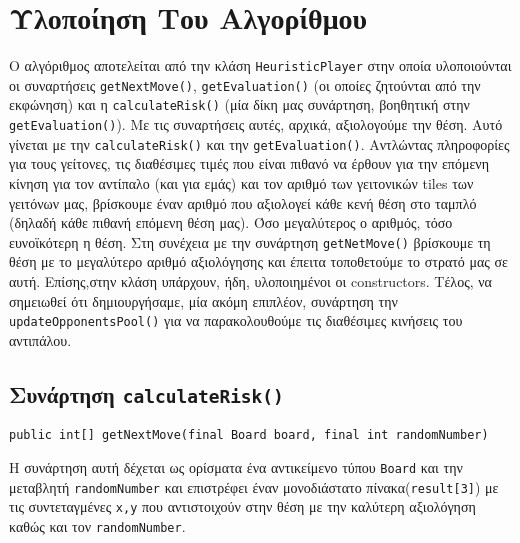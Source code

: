 \chapter{Υλοποίηση Του Αλγορίθμου}
\begin{sloppypar}
Ο αλγόριθμος αποτελείται από την κλάση \lstinline!HeuristicPlayer! στην οποία υλοποιούνται οι  
συναρτήσεις  \lstinline!getNextMove()!,
\lstinline!getEvaluation()! (οι οποίες ζητούνται από την εκφώνηση) και η 
\lstinline!calculateRisk()! (μία δίκη μας συνάρτηση, βοηθητική στην \lstinline!getEvaluation()!).
Με τις συναρτήσεις αυτές, αρχικά, αξιολογούμε την θέση.
Αυτό γίνεται με την \lstinline!calculateRisk()! και την 
\lstinline!getEvaluation()!.
Αντλώντας πληροφορίες για τους γείτονες, τις διαθέσιμες τιμές που είναι 
πιθανό να έρθουν για την επόμενη κίνηση  για τον αντίπαλο (και για εμάς) και τον αριθμό 
των γειτονικών tiles των γειτόνων μας,
βρίσκουμε έναν αριθμό που αξιολογεί κάθε κενή θέση στο ταμπλό
(δηλαδή κάθε πιθανή επόμενη θέση μας).
Όσο μεγαλύτερος ο αριθμός, τόσο ευνοϊκότερη η θέση.
Στη συνέχεια με την συνάρτηση \lstinline!getNetMove()! βρίσκουμε τη 
θέση με το μεγαλύτερο αριθμό αξιολόγησης και έπειτα τοποθετούμε το στρατό μας σε αυτή.
Επίσης,στην κλάση υπάρχουν, ήδη, υλοποιημένοι οι constructors.
Τέλος, να σημειωθεί ότι δημιουργήσαμε, μία ακόμη επιπλέον, συνάρτηση την \lstinline!updateOpponentsPool()! για να 
παρακολουθούμε τις διαθέσιμες κινήσεις του αντιπάλου.
\end{sloppypar}

\section{Συνάρτηση \texttt{calculateRisk()}}
\begin{lstlisting}[numbers=none, title={Declaration της συνάρτησης}]
public int[] getNextMove(final Board board, final int randomNumber)
\end{lstlisting}
Η συνάρτηση αυτή δέχεται ως ορίσματα ένα αντικείμενο τύπου \lstinline!Board! και 
την μεταβλητή \lstinline!randomNumber! και επιστρέφει έναν 
μονοδιάστατο πίνακα(\lstinline!result[3]!) με τις συντεταγμένες \lstinline!x,y! 
που αντιστοιχούν στην θέση με την καλύτερη αξιολόγηση καθώς και τον 
\lstinline!randomNumber!.

